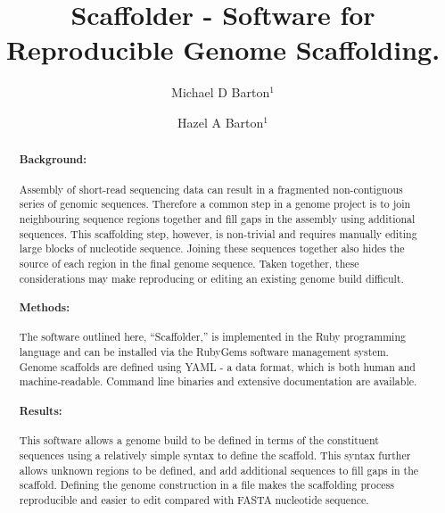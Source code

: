 \documentclass[10pt]{bmc_article}
\newenvironment{bmcformat}{\begin{raggedright}\baselineskip20pt\sloppy\setboolean{publ}{false}}{\end{raggedright}\baselineskip20pt\sloppy}
\begin{document}
\begin{bmcformat}

\title{Scaffolder - Software for Reproducible Genome Scaffolding.} %

\author{
  Michael D Barton$^{1}$\correspondingauthor%
\and
  Hazel A Barton$^1$%
      }

\address{\iid(1) Department of Biological Sciences, Northern Kentucky %
University, Nunn Drive, Highland Heights, KY 41076 }%

\maketitle

\clearpage

\begin{abstract} %

  \paragraph*{Background:} Assembly of short-read sequencing data can result in
  a fragmented non-contiguous series of genomic sequences. Therefore a common
  step in a genome project is to join neighbouring sequence regions together
  and fill gaps in the assembly using additional sequences. This scaffolding
  step, however, is non-trivial and requires manually editing large blocks of
  nucleotide sequence. Joining these sequences together also hides the source
  of each region in the final genome sequence. Taken together, these
  considerations may make reproducing or editing an existing genome build
  difficult.

  \paragraph*{Methods:} The software outlined here, ``Scaffolder,'' is
  implemented in the Ruby programming language and can be installed via the
  RubyGems software management system. Genome scaffolds are defined using
  YAML - a data format, which is both human and machine-readable. Command line
  binaries and extensive documentation are available.

  \paragraph*{Results:} This software allows a genome build to be defined in
  terms of the constituent sequences using a relatively simple syntax to
  define the scaffold. This syntax further allows  unknown regions to be
  defined, and add additional sequences to fill gaps in the scaffold. Defining
  the genome construction in a file makes the scaffolding process reproducible
  and easier to edit compared with FASTA nucleotide sequence.


\end{abstract}
\end{bmcformat}
\end{document}
